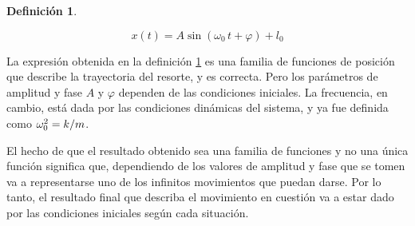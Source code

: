 \documentclass[a5paper,12pt,twoside]{book}
\newtheorem{defn}{{Definición}}[chapter]
\begin{document}
\begin{mdframed}[style=MyFrame1]
    \begin{defn}
        \label{defn:solMAShorizontal}
    \end{defn}
    \begin{equation*}
        x(t) = A \sin{(\omega_0 \, t + \varphi)} + l_0
    \end{equation*}
\end{mdframed}

La expresión obtenida en la definición \ref{defn:solMAShorizontal} es una familia de funciones de posición que describe la trayectoria del resorte, y es correcta. Pero los parámetros de amplitud y fase $A$ y $\varphi$ dependen de las condiciones iniciales. La frecuencia, en cambio, está dada por las condiciones dinámicas del sistema, y ya fue definida como $\omega_0^2 = k/m$.

El hecho de que el resultado obtenido sea una familia de funciones y no una única función significa que, dependiendo de los valores de amplitud y fase que se tomen va a representarse uno de los infinitos movimientos que puedan darse. Por lo tanto, el resultado final que describa el movimiento en cuestión va a estar dado por las condiciones iniciales según cada situación.
\end{document}
